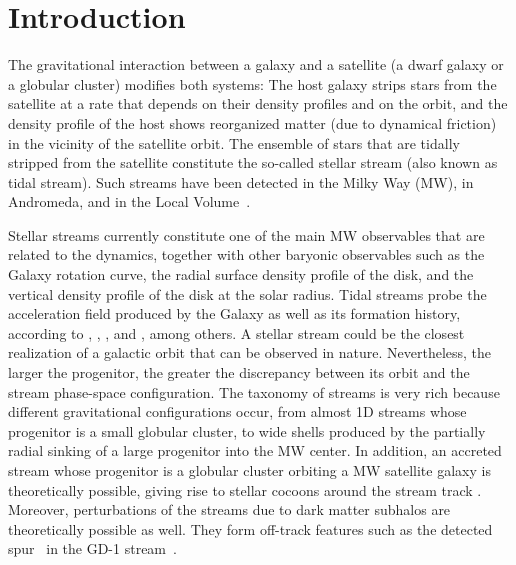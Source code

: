\documentclass[twocolumn]{aa}
\begin{document}
   \maketitle

\section{Introduction}
The gravitational interaction between a galaxy and a satellite (a dwarf galaxy or a globular cluster) modifies both systems: The host galaxy strips stars from the satellite at a rate
that depends on their density profiles and on the orbit,
and the density profile of the host shows reorganized matter (due to dynamical friction) in the vicinity of the satellite orbit.
The ensemble of stars that are tidally stripped from the satellite constitute the so-called stellar stream (also known as tidal stream). Such streams have been detected in the Milky Way (MW), in Andromeda, and in the Local Volume~\citep{Martinez-Delgado_2010}.

Stellar streams currently constitute one of the main MW observables that are related to the dynamics, together with other baryonic observables such as the Galaxy rotation curve, the radial surface density profile of the disk, and the vertical density profile of the disk at the solar radius.
Tidal streams probe the acceleration field produced by the Galaxy \citep{1999ApJ...512L.109J,1999A&A...348L..49Z,2009ApJ...703L..67L,2013MNRAS.436.2386L,2016ASSL..420..169J,Ibata_2016,2017ApJ...842..120I,2017A&A...603A..65T,2021MNRAS.502.4170R} as well as its formation history, according to \citet{1999Natur.402...53H}, \citet{2020ARA&A..58..205H}, \citet{2022A&A...666A..64R}, and \citet{2023arXiv230708730C}, among others.
A stellar stream could be the closest realization of a galactic orbit that can be observed in nature.
Nevertheless, the larger the progenitor, the greater the discrepancy between its orbit and the stream phase-space configuration. The taxonomy of streams is very rich \citep{2015MNRAS.450..575A} because different gravitational configurations occur, from almost 1D streams whose progenitor is a small globular cluster, to wide shells produced by the partially radial sinking of a large progenitor into the MW center. In addition, an accreted stream whose progenitor is a globular cluster orbiting a MW satellite galaxy is theoretically possible, giving rise to stellar cocoons around the
stream track \citep{2018ApJ...861...69C,2019ApJ...881..106M,2021MNRAS.501..179M,2021ApJ...911L..32G,2022MNRAS.511.2339Q}.
Moreover, perturbations of the streams due to dark matter subhalos are theoretically possible as well. They form off-track features such as the detected spur~\citep{Price-Whelan_2018} in
the GD-1 stream~\citep{Grillmair_2006}.
\end{document}
